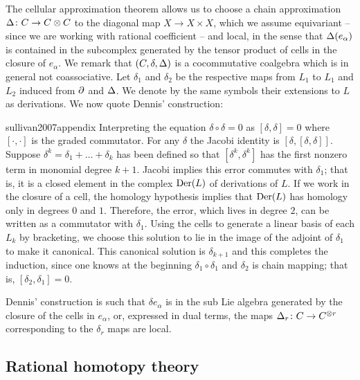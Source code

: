 The cellular approximation theorem allows us to choose a chain approximation $\operatorname{\Delta} \colon C \to C \otimes C$ to the diagonal map $X \to X \times X$, which we assume equivariant -- since we are working with rational coefficient -- and local, in the sense that $\operatorname{\Delta}(e_\alpha)$ is contained in the subcomplex generated by the tensor product of cells in the closure of $e_\alpha$.
We remark that $(C, \delta, \operatorname{\Delta})$ is a cocommutative coalgebra which is in general not coassociative.
Let $\delta_1$ and $\delta_2$ be the respective maps from $L_1$ to $L_1$ and $L_2$ induced from $\partial$ and $\operatorname{\Delta}$.
We denote by the same symbols their extensions to $L$ as derivations.
We now quote Dennis' construction:

\begin{displaycquote}[p.251]{sullivan2007appendix}
	Interpreting the equation $\delta \circ \delta = 0$ as $[\delta, \delta] = 0$ where $[\cdot, \cdot]$ is the graded commutator.
	For any $\delta$ the Jacobi identity is $[\delta, [\delta, \delta]]$.
	Suppose $\delta^k = \delta_1 + \dots + \delta_k$ has been defined so that $[\delta^k, \delta^k]$ has the first nonzero term in monomial degree $k + 1$.
	Jacobi implies this error commutes with $\delta_1$; that is, it is a closed element in the complex $\mathrm{Der}(L)$ of derivations of $L$.
	If we work in the closure of a cell, the homology hypothesis implies that $\mathrm{Der}(L)$ has homology only in degrees $0$ and $1$.
	Therefore, the error, which lives in degree $2$, can be written as a commutator with $\delta_1$.
	Using the cells to generate a linear basis of each $L_k$ by bracketing, we choose this solution to lie in the image of the adjoint of $\delta_1$ to make it canonical.
	This canonical solution is $\delta_{k+1}$ and this completes the induction, since one knows at the beginning $\delta_1 \circ \delta_1$
	and $\delta_2$ is chain mapping; that is, $[\delta_2, \delta_1] = 0$.
\end{displaycquote}

Dennis' construction is such that $\delta e_\alpha$ is in the sub Lie algebra generated by the closure of the cells in $e_\alpha$, or, expressed in dual terms, the maps $\operatorname{\Delta}_r \colon C \to C^{\otimes r}$ corresponding to the $\delta_r$ maps are local.

\subsection{Rational homotopy theory}

